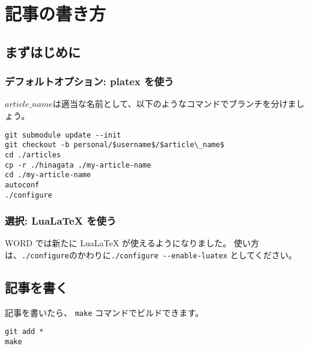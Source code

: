 \usepackage{listings}
\lstset{
  basicstyle=\ttfamily,
  commentstyle=\textit,
  frame=trBL,
  numbers=left,
  breaklines=true,                 %
  language=TeX,                 %
  title=\lstname                   %
}
\usepackage{fancybox}
\usepackage{url}

\subtitle{ヘッダの見出し}
\author{ほげ}



\chapter{記事の書き方}

\section{まずはじめに}

\subsection{デフォルトオプション: platex を使う}

$article\_name$は適当な名前として、以下のようなコマンドでブランチを分けましょう。

\begin{lstlisting}[mathescape]
git submodule update --init
git checkout -b personal/$username$/$article\_name$
cd ./articles
cp -r ./hinagata ./my-article-name
cd ./my-article-name
autoconf
./configure
\end{lstlisting}

\subsection{選択: LuaLaTeX を使う}

WORD では新たに LuaLaTeX が使えるようになりました。
使い方は、\lstinline|./configure|のかわりに\lstinline|./configure --enable-luatex| としてください。

\section{記事を書く}

記事を書いたら、 \lstinline|make| コマンドでビルドできます。

\begin{lstlisting}
git add *
make
\end{lstlisting}

